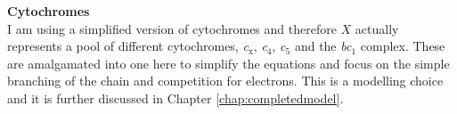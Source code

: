 {\bf Cytochromes}\\
I am using a simplified version of cytochromes and therefore $X$ actually represents a pool of different cytochromes, \textit{c$_{\textrm{x}}$}, \textit{c$_{\textrm{4}}$}, \textit{c$_{\textrm{5}}$} and the \textit{bc$_{\textrm{1}}$} complex. These are amalgamated into one here to simplify the equations and focus on the simple branching of the chain and competition for electrons. This is a modelling choice and it is further discussed in Chapter \ref{chap:completedmodel}.

